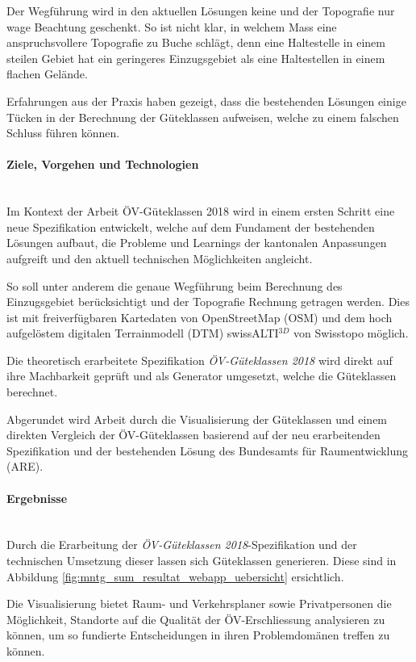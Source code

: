 Der Wegführung wird in den aktuellen Lösungen keine und der Topografie nur wage Beachtung geschenkt.
So ist nicht klar, in welchem Mass eine anspruchsvollere Topografie zu Buche schlägt, denn eine Haltestelle in einem steilen Gebiet hat ein geringeres Einzugsgebiet als eine Haltestellen in einem flachen Gelände.

Erfahrungen aus der Praxis haben gezeigt, dass die bestehenden Lösungen einige Tücken in der Berechnung der Güteklassen aufweisen, welche zu einem falschen Schluss führen können.

\paragraph{Ziele, Vorgehen und Technologien}~\\
Im Kontext der Arbeit ÖV-Güteklassen 2018 wird in einem ersten Schritt eine neue Spezifikation entwickelt, welche auf dem Fundament der bestehenden Lösungen aufbaut, die Probleme und Learnings der kantonalen Anpassungen aufgreift und den aktuell technischen Möglichkeiten angleicht.

So soll unter anderem die genaue Wegführung beim Berechnung des Einzugsgebiet berücksichtigt und der Topografie Rechnung getragen werden.
Dies ist mit freiverfügbaren Kartedaten von OpenStreetMap (OSM) und dem   hoch aufgelöstem digitalen Terrainmodell (DTM) swissALTI$^{3D}$ von Swisstopo möglich.

Die theoretisch erarbeitete Spezifikation \emph{ÖV-Güteklassen 2018} wird direkt auf ihre Machbarkeit geprüft und als Generator umgesetzt, welche die Güteklassen berechnet.

Abgerundet wird Arbeit durch die Visualisierung der Güteklassen und einem direkten Vergleich der ÖV-Güteklassen basierend auf der neu erarbeitenden Spezifikation  und der bestehenden Lösung des Bundesamts für Raumentwicklung (ARE).

\paragraph{Ergebnisse}~\\
Durch die Erarbeitung der \emph{ÖV-Güteklassen 2018}-Spezifikation und der technischen Umsetzung dieser lassen sich Güteklassen generieren.
Diese sind in Abbildung \ref{fig:mntg_sum_resultat_webapp_uebersicht} ersichtlich.

Die Visualisierung bietet Raum- und Verkehrsplaner sowie Privatpersonen die Möglichkeit, Standorte auf die Qualität der ÖV-Erschliessung analysieren zu können, um so fundierte Entscheidungen in ihren Problemdomänen treffen zu können.

